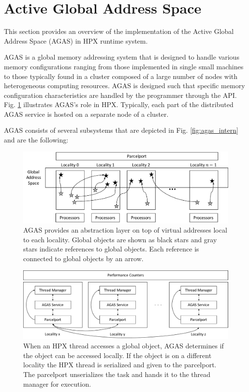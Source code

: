\section{Active Global Address Space}
\label{agas}

This section provides an overview of the implementation of the Active Global
Address Space (AGAS) in HPX runtime system.

AGAS is a global memory addressing system that is designed to
handle various memory configurations ranging from those implemented in single small
machines to those typically found in a cluster composed of a large number of
nodes with heterogeneous computing resources. AGAS is designed such that
specific memory configuration characteristics are handled by the programmer
through the API. Fig.
\ref{fig:agas_struct} illustrates AGAS's role in HPX. Typically, 
each part of the distributed AGAS service is hosted on a separate node of a
cluster.

AGAS consists of several subsystems that are depicted in Fig.
\ref{fig:agas_intern} and are the following:

\begin{figure}[t]
    \centering
    \includegraphics[width=.9\textwidth,height=\textheight,keepaspectratio]{illustrations/agas_struct}
    \caption{AGAS provides an abstraction layer on top of virtual addresses local to each locality. Global objects are shown as black stars and gray stars indicate references to global objects. Each reference is connected to global objects by an arrow.}
    \label{fig:agas_struct}
\end{figure}
\begin{figure}[t]
    \centering
    \includegraphics[width=.9\textwidth,height=\textheight,keepaspectratio]{illustrations/agas_interaction}
    \caption{When an HPX thread accesses a global object, AGAS determines if the object can be accessed locally. If the object is on a different locality the HPX thread is serialized and given to the parcelport. The parcelport unserializes the task and hands it to the thread manager for execution.}
    \label{fig:agas_interaction}
\end{figure}

